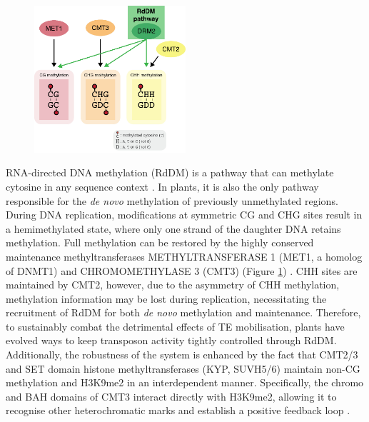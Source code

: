 \begin{figure}[htbp!] 
\centering    
    \includegraphics[width=0.5\textwidth]{Chapter1/Figs/base_mods.png}
\caption{}
\label{fig:meth_pathways}
\captionsetup{font=small}
    \caption*{\citep{RN61}}
\end{figure}

RNA-directed DNA methylation (RdDM) is a pathway that can methylate cytosine in any sequence context \citep{RN33}. In plants, it is also the only pathway responsible for the \textit{de novo} methylation of previously unmethylated regions. During DNA replication, modifications at symmetric CG and CHG sites result in a hemimethylated state, where only one strand of the daughter DNA retains methylation. Full methylation can be restored by the highly conserved maintenance methyltransferases METHYLTRANSFERASE 1 (MET1, a homolog of DNMT1) and CHROMOMETHYLASE 3 (CMT3) (Figure \ref{fig:meth_pathways}) \citep{RN61}. CHH sites are maintained by CMT2, however, due to the asymmetry of CHH methylation, methylation information may be lost during replication, necessitating the recruitment of RdDM for both \textit{de novo} methylation and maintenance. Therefore, to sustainably combat the detrimental effects of TE mobilisation, plants have evolved ways to keep transposon activity tightly controlled through RdDM. Additionally, the robustness of the system is enhanced by the fact that CMT2/3 and SET domain histone methyltransferases (KYP, SUVH5/6) maintain non-CG methylation and H3K9me2 in an interdependent manner. Specifically, the chromo and BAH domains of CMT3 interact directly with H3K9me2, allowing it to recognise other heterochromatic marks and establish a positive feedback loop \citep{RN33}.

